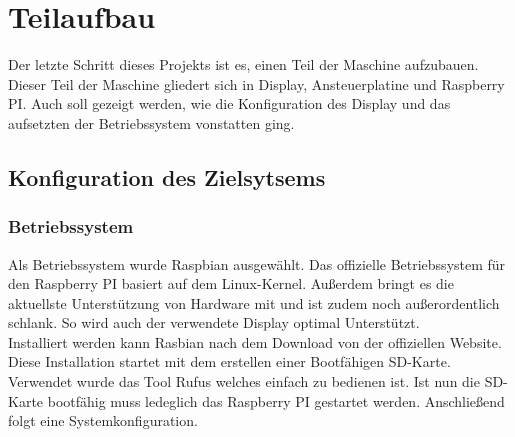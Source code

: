 \section{Teilaufbau}
Der letzte Schritt dieses Projekts ist es, einen Teil der Maschine aufzubauen.
Dieser Teil der Maschine gliedert sich in Display, Ansteuerplatine und Raspberry PI.
Auch soll gezeigt werden, wie die Konfiguration des Display und das aufsetzten der Betriebssystem vonstatten ging.
\subsection{Konfiguration des Zielsytsems}
\subsubsection{Betriebssystem}
Als Betriebssystem wurde Raspbian ausgewählt.
Das offizielle Betriebssystem für den Raspberry PI basiert auf dem Linux-Kernel.
Außerdem bringt es die aktuellste Unterstützung von Hardware mit und ist zudem noch außerordentlich schlank.
So wird auch der verwendete Display optimal Unterstützt.\\
Installiert werden kann Rasbian nach dem Download von der offiziellen Website.
Diese Installation startet mit dem erstellen einer Bootfähigen SD-Karte.
Verwendet wurde das Tool Rufus welches einfach zu bedienen ist.
Ist nun die SD-Karte bootfähig muss ledeglich das Raspberry PI gestartet werden.
Anschließend folgt eine Systemkonfiguration.

